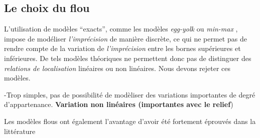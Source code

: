 \subsection{Le choix du flou}



L'utilisation de modèles \enquote{exacts}, comme les modèles
\emph{egg-yolk} \autocite{Cohn1996} ou \emph{min-max}
\autocite{Clementini1996}, impose de modéliser \emph{l'imprécision} de
manière discrète, ce qui ne permet pas de rendre compte de la
variation de \emph{l'imprécision} entre les bornes supérieures et
inférieures. De tels modèles théoriques ne permettent donc pas de
distinguer des \emph{relations de localisation} linéaires ou non
linéaires. Nous devons rejeter ces modèles.


-Trop simples, pas de possibilité de modèliser des variations
importantes de degré d'appartenance. \textbf{Variation non linéaires
  (importantes avec le relief})




Les modèles flous ont également l'avantage d'avoir été fortement
éprouvés dans la littérature


